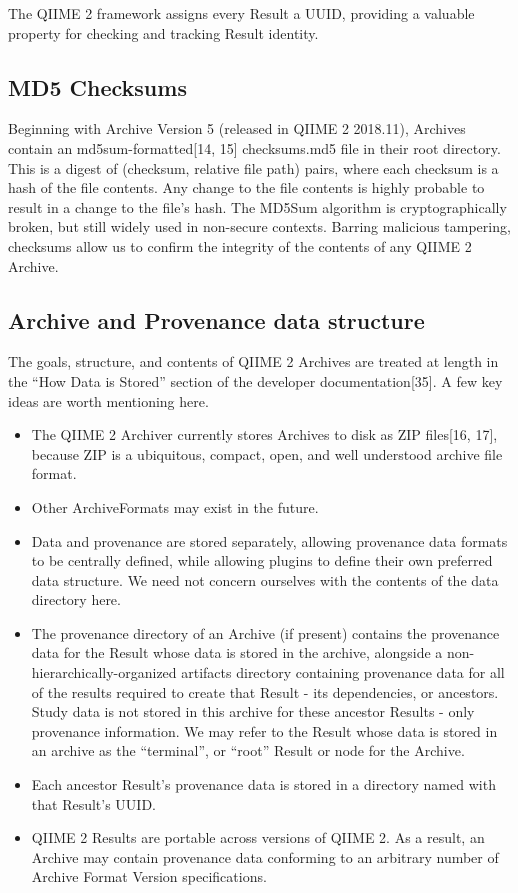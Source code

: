 The QIIME 2 framework assigns every Result a UUID, providing a valuable property
for checking and tracking Result identity. 

\subsection{MD5 Checksums}
Beginning with Archive Version 5 (released in QIIME 2 2018.11), Archives contain an md5sum-formatted[14, 15] checksums.md5 file in their root directory. This is a digest of (checksum, relative file path) pairs, where each checksum is a hash of the file contents. Any change to the file contents is highly probable to result in a change to the file’s hash. The MD5Sum algorithm is cryptographically broken, but still widely used in non-secure contexts. Barring malicious tampering, checksums allow us to confirm the integrity of the contents of any QIIME 2 Archive.

\subsection{Archive and Provenance data structure}
The goals, structure, and contents of QIIME 2 Archives are treated at length in
the “How Data is Stored” section of the developer documentation[35]. A few key
ideas are worth mentioning here.

\begin{itemize}
    \item The QIIME 2 Archiver currently stores Archives to disk as ZIP files[16, 17], because ZIP is a ubiquitous, compact, open, and well understood archive file format.
    \item Other ArchiveFormats may exist in the future.
    \item Data and provenance are stored separately, allowing provenance data formats to be centrally defined, while allowing plugins to define their own preferred data structure. We need not concern ourselves with the contents of the data directory here.
    \item The provenance directory of an Archive (if present) contains the provenance data for the Result whose data is stored in the archive, alongside a non-hierarchically-organized artifacts directory containing provenance data for all of the results required to create that Result - its dependencies, or ancestors. Study data is not stored in this archive for these ancestor Results - only provenance information. We may refer to the Result whose data is stored in an archive as the “terminal”, or “root” Result or node for the Archive.
    \item Each ancestor Result’s provenance data is stored in a directory named with that Result’s UUID.
    \item QIIME 2 Results are portable across versions of QIIME 2. As a result, an Archive may contain provenance data conforming to an arbitrary number of Archive Format Version specifications.
\end{itemize}

